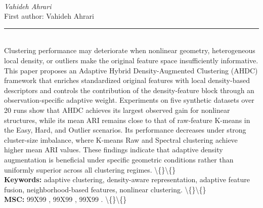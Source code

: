 \documentclass[10pt,twoside]{article}
\begin{document}
\noindent\begin{minipage}[t][\textheight]{\textwidth}
\\[0.35em]
{\itshape Vahideh Ahrari}\\[0.2em]
{\footnotesize First author: Vahideh Ahrari}\\[0.45em]
\noindent\rule{\textwidth}{0.3pt}\\[0.4em]
{\footnotesize  Clustering performance may deteriorate when nonlinear geometry, heterogeneous local density, or outliers make the original feature space insufficiently informative. This paper proposes an Adaptive Hybrid Density-Augmented Clustering (AHDC) framework that enriches standardized original features with local density-based descriptors and controls the contribution of the density-feature block through an observation-specific adaptive weight. Experiments on five synthetic datasets over 20 runs show that AHDC achieves its largest observed gain for nonlinear structures, while its mean ARI remains close to that of raw-feature K-means in the Easy, Hard, and Outlier scenarios. Its performance decreases under strong cluster-size imbalance, where K-means Raw and Spectral clustering achieve higher mean ARI values. These findings indicate that adaptive density augmentation is beneficial under specific geometric conditions rather than uniformly superior across all clustering regimes. \textbackslash\{\}\textbackslash\{\}}\\[0.4em]
{\footnotesize\bfseries Keywords:} {\footnotesize adaptive clustering, density-aware representation, adaptive feature fusion, neighborhood-based features, nonlinear clustering. \textbackslash\{\}\textbackslash\{\}}\\[0.15em]
{\footnotesize\bfseries MSC:} {\footnotesize 99X99 , 99X99 , 99X99 . \textbackslash\{\}\textbackslash\{\}}\\
\vfill
\end{minipage}
\newpage
\end{document}
